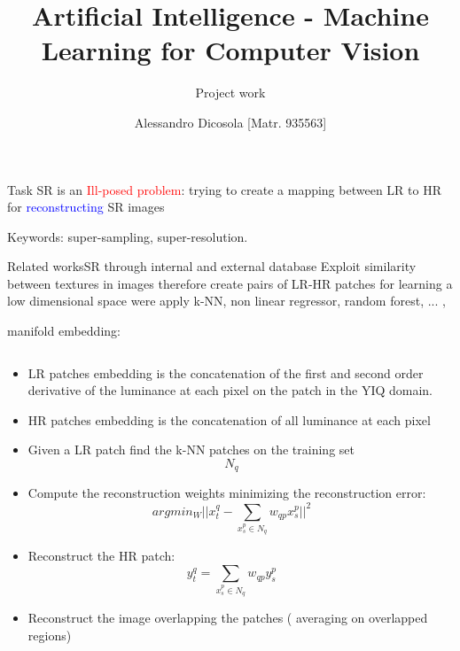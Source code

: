 \documentclass{beamer}
\institute{Alma Mater Studiorum \\ University of Bologna}
\title{Artificial Intelligence - Machine Learning for Computer Vision}
\subtitle{Project work}
\author{Alessandro Dicosola [Matr. 935563]}
\date{}
\begin{document}
\begin{frame}
    \titlepage
\end{frame}

\begin{frame}{Task}
    SR is an \textcolor{red}{Ill-posed problem}: trying to create a mapping between LR to HR for \textcolor{blue}{reconstructing} SR images
    
    Keywords: super-sampling, super-resolution.
\end{frame}

\begin{frame}{Related works}{SR through internal and external database\cite[Releated works]{LapSRN}}
    \small
    Exploit similarity between textures in images therefore create pairs of LR-HR patches for learning a low dimensional space were apply k-NN, non linear regressor, random forest, ... ,

    manifold embedding\cite[2004]{SRneighbporembedding}:
    \begin{columns}
        \begin{column}{0.5\textwidth}
            \begin{itemize}
                \tiny
                \item LR patches embedding is the concatenation of the first and second order derivative of the luminance at each pixel on the patch in the YIQ domain. 
                \item HR patches embedding is the concatenation of all luminance at each pixel
                \item Given a LR patch find the k-NN patches on the training set $$N_q$$
                \item Compute the reconstruction weights minimizing the reconstruction error: $$argmin_W || x_t^q - \sum_{x_s^p \in N_q} w_{qp}x_s^p ||^2$$
                \item Reconstruct the HR patch: $$y_t^q = \sum_{x_s^p \in N_q} w_{qp}y_s^p$$
                \item Reconstruct the image overlapping the patches ( averaging on overlapped regions)
            \end{itemize}            
        \end{column}
        \begin{column}{0.5\textwidth}
            

\end{column}
\end{columns}
\end{frame}
\end{document}
